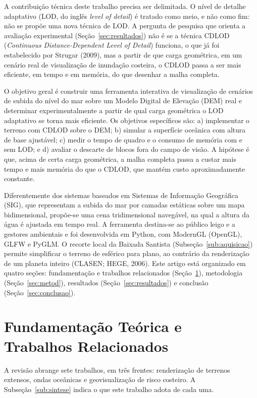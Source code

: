 \documentclass[conference]{IEEEtran}
\begin{document}
A contribuição técnica deste trabalho precisa ser delimitada. O nível de
detalhe adaptativo (LOD, do inglês \emph{level of detail}) é tratado como
meio, e não como fim: não se propõe uma nova técnica de LOD. A pergunta de
pesquisa que orienta a avaliação experimental (Seção~\ref{sec:resultados})
não é se a técnica CDLOD (\emph{Continuous Distance-Dependent Level of
Detail}) funciona, o que já foi estabelecido por Strugar (2009),
mas a partir de que carga geométrica, em um cenário real de visualização
de inundação costeira, o CDLOD passa a ser mais eficiente, em tempo e em
memória, do que desenhar a malha completa.

O objetivo geral é construir uma ferramenta interativa de visualização de
cenários de subida do nível do mar sobre um Modelo Digital de Elevação
(DEM) real e determinar experimentalmente a partir de qual carga geométrica
o LOD adaptativo se torna mais eficiente. Os objetivos específicos são: a)
implementar o terreno com CDLOD sobre o DEM; b) simular a superfície
oceânica com altura de base ajustável; c) medir o tempo de quadro e o
consumo de memória com e sem LOD; e d) avaliar o descarte de blocos fora do campo de visão. A hipótese é que, acima de certa carga geométrica, a malha completa passa a custar mais tempo e mais memória do que o CDLOD, que mantém custo aproximadamente constante.

Diferentemente dos sistemas baseados em Sistemas de Informação Geográfica
(SIG), que representam a subida do mar por camadas estáticas sobre um mapa
bidimensional, propõe-se uma cena tridimensional navegável, na qual a altura
da água é ajustada em tempo real. A ferramenta destina-se ao público leigo e
a gestores ambientais e foi desenvolvida em Python, com ModernGL (OpenGL),
GLFW e PyGLM. O recorte local da Baixada Santista (Subseção~\ref{sub:aquisicao}) permite simplificar o terreno de esférico para plano, ao contrário da renderização de um planeta inteiro (CLASEN; HEGE, 2006). Este artigo está organizado em quatro seções: fundamentação e
trabalhos relacionados (Seção~\ref{sec:fund}), metodologia
(Seção~\ref{sec:metod}), resultados (Seção~\ref{sec:resultados}) e
conclusão (Seção~\ref{sec:conclusao}).

\section{Fundamentação Teórica e Trabalhos Relacionados}
\label{sec:fund}

A revisão abrange sete trabalhos, em três frentes: renderização de terrenos
extensos, ondas oceânicas e geovisualização de risco costeiro. A
Subseção~\ref{sub:sintese} indica o que este trabalho adota de cada uma.
\end{document}
